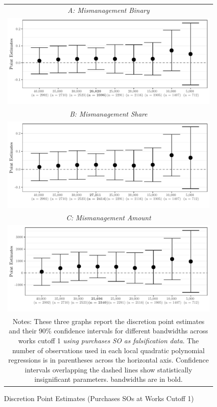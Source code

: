 \documentclass[11pt]{article}
\begin{document}
\begin{figure}[!htbp]
\caption{Discretion Point Estimates (Purchases SOs at Works Cutoff 1)}
\label{fig:01falsification}
\centering
\small
\begin{tabular}{c}
\emph{A: Mismanagement Binary} \\
\includegraphics[scale = .70]{../plots/01falsificationplot1.pdf} \\
\emph{B: Mismanagement Share} \\
\includegraphics[scale = .70]{../plots/01falsificationplot2.pdf} \\
\emph{C: Mismanagement Amount} \\
\includegraphics[scale = .70]{../plots/01falsificationplot3.pdf} \\
\multicolumn{1}{p{.67\textwidth}}{\scriptsize Notes: These three graphs report the discretion point estimates and their 90\% confidence intervals for different bandwidths across works cutoff 1 \emph{using purchases SO as falsification data}. The number of observations used in each local quadratic polynomial regressions is in parentheses across the horizontal axis. Confidence intervals overlapping the dashed lines show statistically insignificant parameters. \citet{CalonicoOptimalDataDrivenRegression2015} bandwidths are in bold.}
\end{tabular}
\end{figure}
\end{document}
